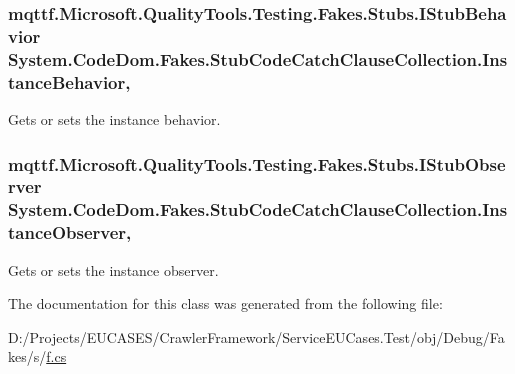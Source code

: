 \hypertarget{class_system_1_1_code_dom_1_1_fakes_1_1_stub_code_catch_clause_collection_a15426d33731bbad69d1a65cd9a26a247}{
\subsubsection[{Instance\-Behavior}]{\setlength{\rightskip}{0pt plus 5cm}mqttf.\-Microsoft.\-Quality\-Tools.\-Testing.\-Fakes.\-Stubs.\-I\-Stub\-Behavior System.\-Code\-Dom.\-Fakes.\-Stub\-Code\-Catch\-Clause\-Collection.\-Instance\-Behavior\hspace{0.3cm}{\ttfamily [get]}, {\ttfamily [set]}}}\label{class_system_1_1_code_dom_1_1_fakes_1_1_stub_code_catch_clause_collection_a15426d33731bbad69d1a65cd9a26a247}


Gets or sets the instance behavior.

\hypertarget{class_system_1_1_code_dom_1_1_fakes_1_1_stub_code_catch_clause_collection_a5c3a6e33053d734815d36258c674bdae}{
\subsubsection[{Instance\-Observer}]{\setlength{\rightskip}{0pt plus 5cm}mqttf.\-Microsoft.\-Quality\-Tools.\-Testing.\-Fakes.\-Stubs.\-I\-Stub\-Observer System.\-Code\-Dom.\-Fakes.\-Stub\-Code\-Catch\-Clause\-Collection.\-Instance\-Observer\hspace{0.3cm}{\ttfamily [get]}, {\ttfamily [set]}}}\label{class_system_1_1_code_dom_1_1_fakes_1_1_stub_code_catch_clause_collection_a5c3a6e33053d734815d36258c674bdae}


Gets or sets the instance observer.



The documentation for this class was generated from the following file\-:\begin{DoxyCompactItemize}
\item 
D\-:/\-Projects/\-E\-U\-C\-A\-S\-E\-S/\-Crawler\-Framework/\-Service\-E\-U\-Cases.\-Test/obj/\-Debug/\-Fakes/s/\hyperlink{s_2f_8cs}{f.\-cs}\end{DoxyCompactItemize}
